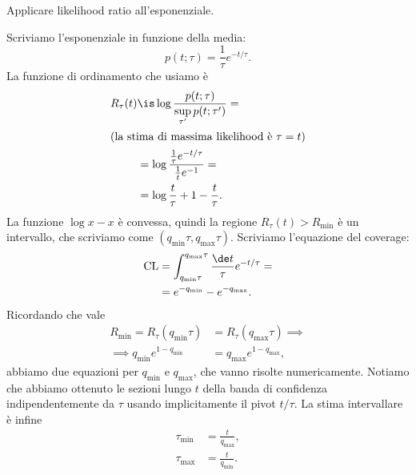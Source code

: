
\begin{exercise}
	Applicare likelihood ratio all'esponenziale.
\end{exercise}

\begin{solution*}
	Scriviamo l'esponenziale in funzione della media:
	\begin{equation*}
		p(t;\tau)
		= \frac1\tau e^{-t/\tau}.
	\end{equation*}
	La funzione di ordinamento che usiamo è
	\begin{align*}
		R_\tau(t)
		&\is \log \frac {p(t;\tau)} {\sup\limits_{\tau'} p(t;\tau')} = \\
		\intertext{(la stima di massima likelihood è $\tau=t$)}
		&= \log \frac {\frac1\tau e^{-t/\tau}} {\frac1t e^{-1}} = \\
		&= \log\frac t\tau + 1 - \frac t\tau.
	\end{align*}
	La funzione $\log x - x$ è convessa,
	quindi la regione $R_\tau(t)>R_\mathrm{min}$ è un intervallo,
	che scriviamo come $(q_\mathrm{min}\tau, q_\mathrm{max}\tau)$.
	Scriviamo l'equazione del coverage:
	\begin{align*}
		\mathrm{CL}
		&= \int_{q_\mathrm{min}\tau}^{q_\mathrm{max}\tau} \frac{\de t}\tau e^{-t/\tau} = \\
		&= e^{-q_\mathrm{min}} - e^{-q_\mathrm{max}}.
	\end{align*}
	Ricordando che vale
	\begin{align*}
		R_\mathrm{min} = R_\tau(q_\mathrm{min}\tau)
		&= R_\tau(q_\mathrm{max}\tau) \implies \\
		\implies q_\mathrm{min} e^{1-q_\mathrm{min}}
		&= q_\mathrm{max} e^{1-q_\mathrm{max}},
	\end{align*}
	abbiamo due equazioni per $q_\mathrm{min}$ e $q_\mathrm{max}$,
	che vanno risolte numericamente.
	Notiamo che abbiamo ottenuto le sezioni lungo $t$ della banda di confidenza
	indipendentemente da $\tau$
	usando implicitamente il pivot $t/\tau$.
	La stima intervallare è infine
	\begin{align*}
		\tau_\mathrm{min}
		&= \frac t {q_\mathrm{max}}, \\
		\tau_\mathrm{max}
		&= \frac t {q_\mathrm{min}}.
	\end{align*}
\end{solution*}
